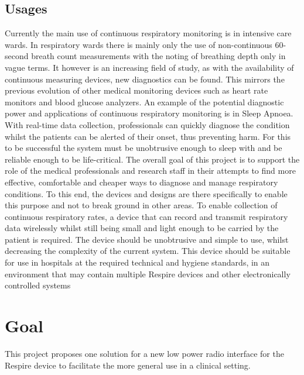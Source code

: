 \subsection{Usages}
Currently the main use of continuous respiratory monitoring is in intensive
care wards. In respiratory wards there is mainly only the use of non-continuous
60-second breath count measurements with the noting of breathing depth only in vague
terms. It however is an increasing field of study, as with the availability of continuous measuring
devices, new diagnostics can be found. This mirrors the previous evolution of other medical
monitoring devices such as heart rate monitors and blood glucose analyzers.
An example of the potential diagnostic power and applications of continuous respiratory
monitoring is in Sleep Apnoea. With real-time data collection, professionals can quickly diagnose the
condition whilst the patients can be alerted of their onset, thus preventing harm.
For this to be successful the system must be unobtrusive enough to
sleep with and be reliable enough to be life-critical.
The overall goal of this project is to support the role of the medical
professionals and research staff in their attempts to find more
effective, comfortable and cheaper ways to diagnose and manage
respiratory conditions. To this end, the devices and designs are there specifically to enable this
purpose and not to break ground in other areas.
To enable collection of continuous respiratory rates, a device that can record and transmit
respiratory data wirelessly whilst still being small and light enough to be carried by the patient is
required. The device should be unobtrusive and simple to use, whilst decreasing the complexity of
the current system. This device should be suitable for use in hospitals at the required technical and
hygiene standards, in an environment that may contain multiple Respire devices and other
electronically controlled systems

\section{Goal}
This project proposes one solution for a new low power radio interface for the Respire device to
facilitate the more general use in a clinical setting.


